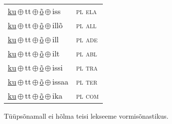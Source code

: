 \begin{minipage}{\textwidth}
\begin{sideways}
\begin{tabular}{l l}
\underline{ku}\,$\oplus$\,tt\,$\oplus$\,\underline{õ}\,$\oplus$\,iss & \textsc{ pl ela } \\
\underline{ku}\,$\oplus$\,tt\,$\oplus$\,\underline{õ}\,$\oplus$\,illõ & \textsc{ pl all } \\
\underline{ku}\,$\oplus$\,tt\,$\oplus$\,\underline{õ}\,$\oplus$\,ill & \textsc{ pl ade } \\
\underline{ku}\,$\oplus$\,tt\,$\oplus$\,\underline{õ}\,$\oplus$\,ilt & \textsc{ pl abl } \\
\underline{ku}\,$\oplus$\,tt\,$\oplus$\,\underline{õ}\,$\oplus$\,issi & \textsc{ pl tra } \\
\underline{ku}\,$\oplus$\,tt\,$\oplus$\,\underline{õ}\,$\oplus$\,issaa & \textsc{ pl ter } \\
\underline{ku}\,$\oplus$\,tt\,$\oplus$\,\underline{õ}\,$\oplus$\,ika & \textsc{ pl com } \\
\end{tabular}
\end{sideways}
\label{tab:tüüpsõnamall-kuõ}

\end{minipage}

 
\vspace{1em}
\noindent Tüüpsõnamall  ei hõlma teisi lekseeme vormi\-sõnastikus.
